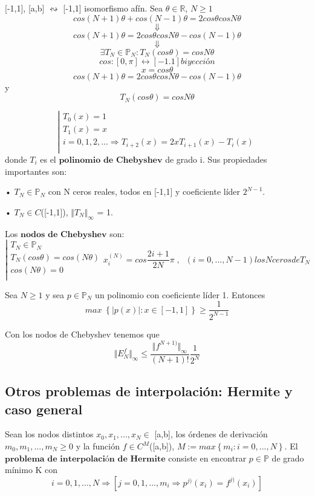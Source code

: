[-1,1], [a,b] $\leftrightsquigarrow$ [-1,1] isomorfismo afín. Sea $\theta \in \mathbb{R}$, $N \geq 1$
\[ cos(N+1) \theta + cos(N-1) \theta = 2cos \theta cos N\theta \]
\[\Downarrow \]
\[ cos(N+1) \theta = 2cos \theta cos N\theta - cos(N-1) \theta \]
\[ \Downarrow \]
\[ \exists T_N \in \mathbb{P}_N : T_N (cos \theta ) = cos N\theta \]
\[ cos : \left[ 0,\pi \right] \longleftrightarrow \left[ -1.1 \right] biyección \]
\[ x = cos \theta \]
\[ cos (N+1) \theta = 2 cos \theta cos N\theta - cos(N-1) \theta \]
y
\[ T_N(cos \theta ) = cos N\theta \]

\[
\left|
\begin{array}{c}
T_0(x)=1 \\
T_1(x)=x \\
i=0,1,2,... \Rightarrow T_{i+2}(x)=2xT_{i+1}(x)-T_i(x) \\
\end{array}
\right.
\]
donde $T_i$ es el $\textbf{polinomio de Chebyshev}$ de grado i. Sus propiedades importantes son:

\begin{nlist}
\item[•] $T_N \in \mathbb{P}_N$ con N ceros reales, todos en [-1,1] y coeficiente líder $2^{N-1}$.
\item[•] $T_N \in C$([-1,1]), $\Vert T_N \Vert _\infty$ = 1.
\end{nlist}

Los $\textbf{nodos de Chebyshev}$ son:
\[
\left|
\begin{array}{c}
T_N \in \mathbb{P}_N \\
T_N(cos \theta ) = cos(N \theta ) \\
cos(N\theta ) = 0 \\
\end{array}
\right.
x_i^{(N)} = cos \frac{2i+1}{2N}\pi \; , \; \; (i=0,...,N-1) los N ceros de T_N
\]

\begin{nth}
Sea $N \geq 1$ y sea $p \in \mathbb{P} _N$ un polinomio con coeficiente líder 1. Entonces
\[ max \; \left\lbrace \vert p(x) \vert : x \in \left[ -1,1 \right] \right\rbrace \geq \frac{1}{2^{N-1}} \]
\end{nth}

Con los nodos de Chebyshev tenemos que
\[ \Vert E_N^f \Vert _\infty \leq \frac{\Vert f^{N+1)} \Vert _\infty}{(N+1)!} \frac{1}{2^N} \]

\subsection{Otros problemas de interpolación: Hermite y caso general}
Sean los nodos distintos $x_0,x_1,...,x_N \in$ [a,b], los órdenes de derivación $m_0,m_1,...,m_N \geq 0$ y la función $f \in C^M$([a,b]), $M:= max \left\lbrace m_i : i=0,...,N \right\rbrace$. El $\textbf{problema de interpolación de Hermite}$ consiste en encontrar $p \in \mathbb{P}$ de grado mínimo K con
\[ i=0,1,...,N \Rightarrow \left[ j=0,1,...,m_i \Rightarrow p^{j)}(x_i) = f^{j)}(x_i) \right] \]

